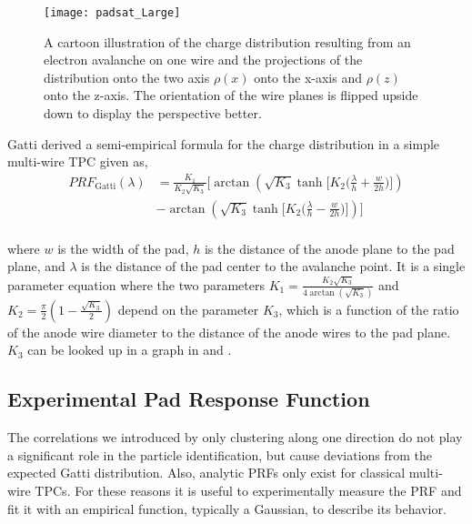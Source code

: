 \begin{figure}[!htb]
\texttt{[image: padsat\_Large]}
\caption{A cartoon illustration of the charge distribution resulting from an electron avalanche on one wire and the projections of the distribution onto the two axis $\rho(x)$ onto the x-axis and $\rho(z)$ onto the z-axis. The orientation of the wire planes is flipped upside down to display the perspective better.}
\label{fig:2DPRF}
\end{figure}

Gatti \cite{gatti} derived a semi-empirical formula for the charge distribution in a simple multi-wire TPC given as, 
\begin{equation}\label{eq:gatti}
\begin{split}
PRF_{\mathrm{Gatti}}(\lambda)
& = \frac{K_{1}}{K_{2}\sqrt{K_{3}}}\bigl[\arctan(\sqrt{K_{3}}\tanh\bigl[K_{2}\bigl(\frac{\lambda}{h}+\frac{w}{2h}\bigr)\bigr]) \\
& - \arctan(\sqrt{K_{3}}\tanh\bigl[K_{2}\bigl(\frac{\lambda}{h}-\frac{w}{2h}\bigr)\bigr])\bigr] \\
\end{split}
\end{equation}

where $w$ is the width of the pad, $h$ is the distance of the anode plane to the pad plane, and $\lambda$ is the distance of the pad center to the avalanche point. It is a single parameter equation where the two parameters $K_1 = \frac{K_{2}\sqrt{K_3}}{4 \arctan(\sqrt{K_3})}$ and $K_2 = \frac{\pi}{2}\left(1-\frac{\sqrt{K_{3}}}{2}\right)$ depend on the parameter $K_3$, which is a function of the ratio of the anode wire diameter to the distance of the anode wires to the pad plane. $K_3$ can be looked up in a graph in \cite{blumrol} and \cite{gatti}.



\subsection{Experimental Pad Response Function}

The correlations we introduced by only clustering along one direction do not play a significant role in the particle identification, but cause deviations from the expected Gatti distribution. Also, analytic PRFs only exist for classical multi-wire TPCs. For these reasons it is useful to experimentally measure the PRF and fit it with an empirical function, typically a Gaussian, to describe its behavior. 

